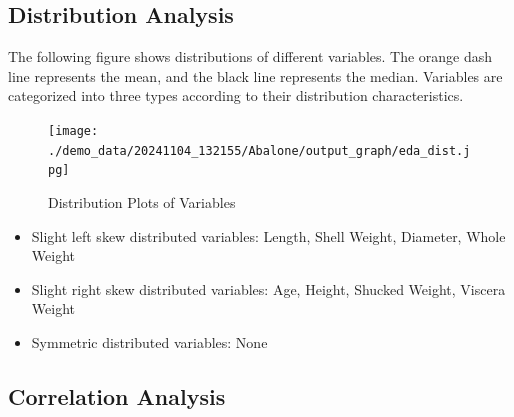 \documentclass{article}
\begin{document}
\subsection{Distribution Analysis}
The following figure shows distributions of different variables. The orange dash line represents the mean, 
and the black line represents the median. Variables are categorized into three types according to their distribution characteristics.

\begin{figure}[H]
\centering
\texttt{[image: ./demo\_data/20241104\_132155/Abalone/output\_graph/eda\_dist.jpg]}
\caption{\label{fig:dist}Distribution Plots of Variables}
\end{figure}

\begin{itemize}
\item Slight left skew distributed variables: Length, Shell Weight, Diameter, Whole Weight
\item Slight right skew distributed variables: Age, Height, Shucked Weight, Viscera Weight
\item Symmetric distributed variables: None
\end{itemize}

\subsection{Correlation Analysis}
\end{document}
